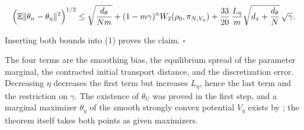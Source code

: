 \documentclass[11pt,a4paper]{article}
\begin{document}
\[\Bigl(\mathbb E\|\theta_n-\theta_\eta\|^2\Bigr)^{1/2}\le\sqrt{\frac{d_\theta}{Nm}}+(1-m\gamma)^nW_2(\rho_0,\pi_{N,V_\eta})+\frac{33}{20}\,\frac{L_\eta}{m}\sqrt{d_x+\frac{d_\theta}N}\,\sqrt\gamma .\]


Inserting both bounds into (1) proves the claim. \(\square\)




The four terms are the smoothing bias, the equilibrium spread of the parameter marginal, the contracted initial transport distance, and the discretization error. Decreasing \(\eta\) decreases the first term but increases \(L_\eta\), hence the last term and the restriction on \(\gamma\). The existence of \(\theta_U\) was proved in the first step, and a marginal maximizer \(\theta_\eta\) of the smooth strongly convex potential \(V_\eta\) exists by \cite[Section~3.9.4]{LangevinLean2026IPLA}; the theorem itself takes both points as given maximizers.
\end{document}
